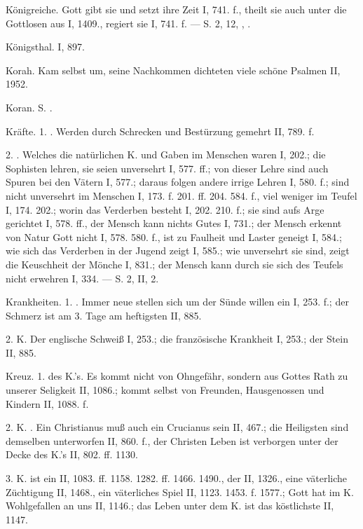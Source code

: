 Königreiche. Gott gibt sie und setzt ihre Zeit I, 741. f., theilt sie auch unter die Gottlosen aus I, 1409., regiert sie I, 741. f. — S.  2,  12, , .

Königsthal. I, 897.

Korah. Kam selbst um, seine Nachkommen dichteten viele schöne Psalmen II, 1952.

Koran. S. .

Kräfte. 1. . Werden durch Schrecken und Bestürzung gemehrt II, 789. f.

2. . Welches die natürlichen K. und Gaben im Menschen waren I, 202.; die Sophisten lehren, sie seien unversehrt I, 577. ff.; von dieser Lehre sind auch Spuren bei den Vätern I, 577.; daraus folgen andere irrige Lehren I, 580. f.; sind nicht unversehrt im Menschen I, 173. f. 201. ff. 204. 584. f., viel weniger im Teufel I, 174. 202.; worin das Verderben besteht I, 202. 210. f.; sie sind aufs Arge gerichtet I, 578. ff., der Mensch kann nichts Gutes I, 731.; der Mensch erkennt von Natur Gott nicht I, 578. 580. f., ist zu Faulheit und Laster geneigt I, 584.; wie sich das Verderben in der Jugend zeigt I, 585.; wie unversehrt sie sind, zeigt die Keuschheit der Mönche I, 831.; der Mensch kann durch sie sich des Teufels nicht erwehren I, 334. — S.  2,  II, 2.

Krankheiten. 1. . Immer neue stellen sich um der Sünde willen ein I, 253. f.; der Schmerz ist am 3. Tage am heftigsten II, 885.

2.  K. Der englische Schweiß I, 253.; die französische Krankheit I, 253.; der Stein II, 885.

Kreuz. 1.  des K.’s. Es kommt nicht von Ohngefähr, sondern aus Gottes Rath zu unserer Seligkeit II, 1086.; kommt selbst von Freunden, Hausgenossen und Kindern II, 1088. f.

2.  K. . Ein Christianus muß auch ein Crucianus sein II, 467.; die Heiligsten sind demselben unterworfen II, 860. f., der Christen Leben ist verborgen unter der Decke des K.’s II, 802. ff. 1130.

3. K. ist ein  II, 1083. ff. 1158. 1282. ff. 1466. 1490., der  II, 1326., eine väterliche Züchtigung II, 1468., ein väterliches Spiel II, 1123. 1453. f. 1577.; Gott hat im K. Wohlgefallen an uns II, 1146.; das Leben unter dem K. ist das köstlichste II, 1147.

